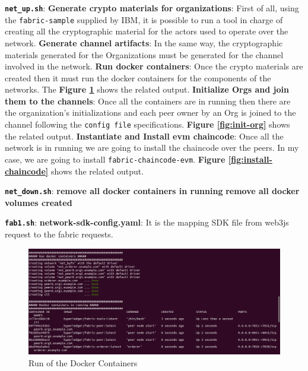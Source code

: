 \begin{outline}
    \1 \textbf{\texttt{net\_up.sh}}:
    \2 \textbf{Generate crypto materials for organizations}: First of all, using the \texttt{fabric-sample} supplied
    by IBM, it is possible to run a tool in charge of creating all the cryptographic material for the actors 
    used to operate over the network. 
    \2 \textbf{Generate channel artifacts}: In the same way, the cryptographic materials generated for the 
    Organizations must be generated for the channel involved in the network.
    \2 \textbf{Run docker containers}: Once the crypto materials are created then it must run the docker containers
    for the components of the networks. The \textbf{Figure \ref{fig:docker-run}} shows the related output.
    \2 \textbf{Initialize Orgs and join them to the channels}: Once all the containers are in running then there are
    the organization's initializations and each peer owner by an Org is joined to the channel following
    the \texttt{config file} specifications. \textbf{Figure \ref{fig:init-org}} shows the related output.
    \2 \textbf{Instantiate and Install evm chaincode}: Once all the network is in running we are going to install 
    the chaincode over the peers. In my case, we are going to install \texttt{fabric-chaincode-evm}.
    \textbf{Figure \ref{fig:install-chaincode}} shows the related output.

    \1 \textbf{\texttt{net\_down.sh}}:
    \2 \textbf{remove all docker containers in running}
    \2 \textbf{remove all docker volumes created}

    \1 \textbf{\texttt{fab1.sh}}:
    \2 \textbf{network-sdk-config.yaml}: It is the mapping SDK file from web3js request to the fabric requests. 

\end{outline}

\begin{figure}[!ht]
    \centering
    \includegraphics[totalheight=6cm]{img/network/net-1.png}
    \caption{Run of the Docker Containers}
    \label{fig:docker-run}
\end{figure}


